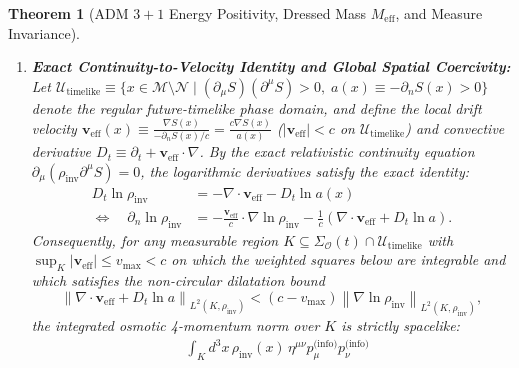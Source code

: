 \documentclass[11pt, a4paper]{article}
\newtheorem{theorem}{Theorem}[section]
\theoremstyle{definition}
\begin{document}
\begin{theorem}[ADM $3+1$ Energy Positivity, Dressed Mass $M_{\text{eff}}$, and Measure Invariance]
\begin{enumerate}[label=(\roman*)]
\begin{equation}
\begin{aligned}
    &= \frac{\hbar^2}{4} \int_{\Sigma_{\mathcal{O}}} d^3x \, \rho_{\text{inv}} |\nabla \ln\rho_{\text{inv}}|^2 \ge 0
    \end{aligned}
    \end{equation}
    is strictly positive-definite for all non-constant densities $\rho_{\text{inv}}$.
    \item \textbf{Exact Continuity-to-Velocity Identity and Global Spatial Coercivity:} Let $\mathcal{U}_{\text{timelike}} \equiv \{ x \in \mathcal{M}\setminus\mathcal{N} \mid (\partial_\mu S)(\partial^\mu S) > 0, \; a(x) \equiv -\partial_n S(x) > 0 \}$ denote the regular future-timelike phase domain, and define the local drift velocity $\mathbf{v}_{\text{eff}}(x) \equiv \frac{\nabla S(x)}{-\partial_n S(x)/c} = \frac{c\nabla S(x)}{a(x)}$ ($|\mathbf{v}_{\text{eff}}| < c$ on $\mathcal{U}_{\text{timelike}}$) and convective derivative $D_t \equiv \partial_t + \mathbf{v}_{\text{eff}}\cdot\nabla$. By the exact relativistic continuity equation $\partial_\mu(\rho_{\text{inv}}\partial^\mu S) = 0$, the logarithmic derivatives satisfy the exact identity:
    \begin{equation}
    \label{eq:normal_log_rho}
    \begin{aligned}
    D_t \ln\rho_{\text{inv}} &= -\nabla \cdot \mathbf{v}_{\text{eff}} - D_t \ln a(x) \\
    \Longleftrightarrow \quad \partial_n \ln\rho_{\text{inv}} &= -\frac{\mathbf{v}_{\text{eff}}}{c}\cdot\nabla\ln\rho_{\text{inv}} - \frac{1}{c}\left( \nabla\cdot\mathbf{v}_{\text{eff}} + D_t \ln a \right).
    \end{aligned}
    \end{equation}
    Consequently, for any measurable region $K \subseteq \Sigma_{\mathcal{O}}(t) \cap \mathcal{U}_{\text{timelike}}$ with $\sup_{K} |\mathbf{v}_{\text{eff}}| \le v_{\max} < c$ on which the weighted squares below are integrable and which satisfies the non-circular dilatation bound
    \begin{equation}
    \label{eq:dilatation_coercivity_bound}
    \left\| \nabla \cdot \mathbf{v}_{\text{eff}} + D_t \ln a \right\|_{L^2(K,\rho_{\text{inv}})} < (c - v_{\max}) \left\| \nabla \ln\rho_{\text{inv}} \right\|_{L^2(K,\rho_{\text{inv}})},
    \end{equation}
    the integrated osmotic 4-momentum norm over $K$ is strictly spacelike:
    \begin{equation}
    \label{eq:spacelike_coercivity}
    \begin{aligned}
    &\int_{K} d^3x \, \rho_{\text{inv}}(x) \, \eta^{\mu\nu} p_\mu^{\text{(info)}} p_\nu^{\text{(info)}} \\

\end{aligned}
\end{equation}
\end{enumerate}
\end{theorem}
\end{document}
